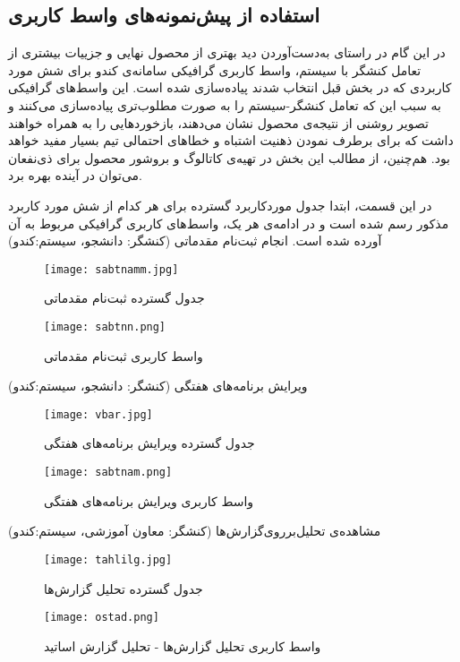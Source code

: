 \documentclass{report}
\begin{document}
\subsection{استفاده از پیش‌نمونه‌های واسط کاربری}
در این گام در راستای به‌دست‌آوردن دید بهتری از محصول  نهایی و جزییات بیشتری از تعامل کنشگر با سیستم،  واسط کاربری گرافیکی سامانه‌ی کندو برای شش مورد کاربردی که در بخش قبل انتخاب شدند پیاده‌سازی شده است. این واسط‌های گرافیکی به سبب این که تعامل کنشگر-سیستم را به صورت مطلوب‌تری پیاده‌سازی می‌کنند و تصویر روشنی از نتیجه‌ی محصول نشان می‌دهند، بازخوردهایی را به همراه خواهند داشت که برای برطرف نمودن ذهنیت اشتباه و خطاهای احتمالی تیم بسیار مفید خواهد بود. هم‌چنین، از مطالب این بخش در تهیه‌ی کاتالوگ و بروشور محصول برای ذی‌نفعان می‌توان در آینده بهره برد.
 
در این قسمت، ابتدا جدول موردکاربرد گسترده‌ برای هر کدام از شش مورد کاربرد مذکور رسم شده‌ است و در ادامه‌ی هر یک، واسط‌های کاربری گرافیکی مربوط به آن‌ آورده شده است. 
\clearpage
{}
\textbf{}
انجام ثبت‌نام مقدماتی (کنشگر: دانشجو، سیستم:کندو)
\begin{figure}[!htb]
\centering
\texttt{[image: sabtnamm.jpg]}
\caption{جدول گسترد‌ه‌ ثبت‌نام مقدماتی}
\end{figure}
\vspace{\baselineskip}
\begin{figure}[!htb]
\centering
\texttt{[image: sabtnn.png]}
\caption{واسط کاربری ثبت‌نام مقدماتی}
\end{figure} 
\pagebreak
\clearpage
\restoregeometry
\textbf{}
ویرایش برنامه‌های هفتگی (کنشگر: دانشجو، سیستم:کندو)
\begin{figure}[!htb]
\centering
\texttt{[image: vbar.jpg]}
\caption{جدول گسترده‌ ویرایش برنامه‌‌های هفتگی}
\end{figure}
\clearpage
\begin{figure}
\centering
\texttt{[image: sabtnam.png]}
\caption{واسط کاربری ویرایش برنامه‌‌های هفتگی}
\end{figure}
\clearpage
{}
ﻣﺸﺎﻫﺪﻩ‌ﯼ ﺗﺤﻠﯿﻞﺑﺮﺭﻭﯼﮔﺰﺍﺭﺵ‌ﻫﺎ (کنشگر: معاون آموزشی، ﺳﯿﺴﺘﻢ:ﮐﻨﺪﻭ)
\begin{figure}[!htb]
\centering
\texttt{[image: tahlilg.jpg]}
\caption{جدول گسترده‌ تحلیل گزارش‌ها}
\end{figure} 
\vspace{\baselineskip}
\begin{figure}[!htb]
\centering
\texttt{[image: ostad.png]}
\caption{ واسط کاربری تحلیل گزارش‌ها - تحلیل گزارش اساتید}
\end{figure}
\end{document}
